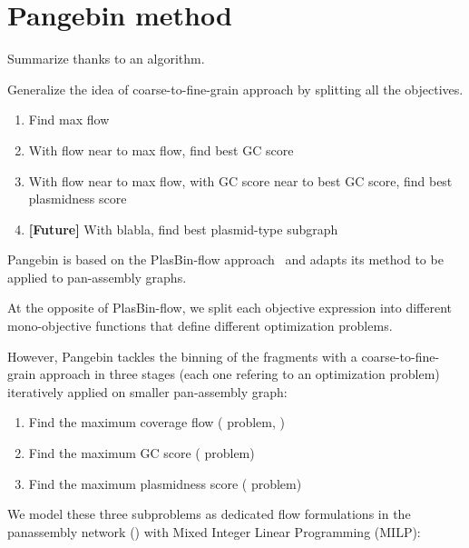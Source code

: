 \section{Pangebin method}

\begin{todobox}
  Summarize thanks to an algorithm.
\end{todobox}

\begin{todobox}
  Generalize the idea of coarse-to-fine-grain approach by splitting all the objectives.

  \begin{enumerate}[label=\roman*.]
    \item Find max flow
    \item With flow near to max flow, find best GC score
    \item With flow near to max flow, with GC score near to best GC score, find best plasmidness score
    \item \textbf{[Future]} With blabla, find best plasmid-type subgraph
  \end{enumerate}
\end{todobox}

Pangebin is based on the PlasBin-flow approach~\cite{manePlasBinflowFlowbasedMILP2023} and adapts its method to be applied to pan-assembly graphs.

\begin{newfeatbox}
  At the opposite of PlasBin-flow, we split each objective expression into different mono-objective functions that define different optimization problems.
\end{newfeatbox}

However, Pangebin tackles the binning of the fragments with a coarse-to-fine-grain approach in three stages (each one refering to an optimization problem) iteratively applied on smaller pan-assembly graph:

\begin{enumerate}[label=\roman*.]
  \item Find the maximum coverage flow (\MCF{} problem, )
  \item Find the maximum GC score (\MGC{} problem)
  \item Find the maximum plasmidness score (\MPS{} problem)
\end{enumerate}

We model these three subproblems as dedicated flow formulations in the panassembly network () with Mixed Integer Linear Programming (MILP):

